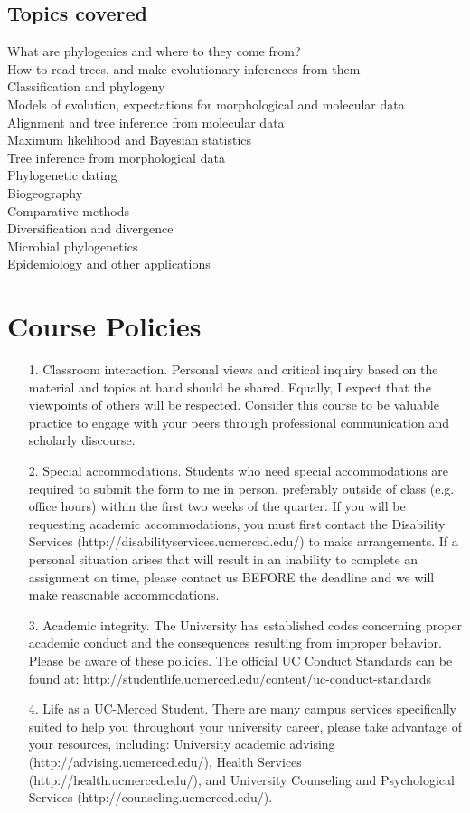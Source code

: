 \documentclass{article}
\begin{document}
\subsection*{Topics covered}
What are phylogenies and where to they come from?\\
How to read trees, and make evolutionary inferences from them\\
Classification and phylogeny\\
Models of evolution, expectations for morphological and molecular data\\
Alignment and tree inference from molecular data\\
Maximum likelihood and Bayesian statistics\\
Tree inference from morphological data\\
Phylogenetic dating\\
Biogeography\\
Comparative methods\\
Diversification and divergence\\
Microbial phylogenetics\\
Epidemiology and other applications\\


\section*{Course Policies}
\begin{itemize}
 \item[1.] Classroom interaction. Personal views and critical inquiry based on the material and topics at hand should be shared.
 Equally, I expect that the viewpoints of others will be respected. 
 Consider this course to be valuable practice to engage with your peers through professional communication and scholarly discourse. 
 \item[2.] Special accommodations. Students who need special accommodations are required to submit the form to me in person, preferably outside of class (e.g. office hours) within the first two weeks of the quarter. 
 If you will be requesting academic accommodations, you must first contact the Disability Services (http://disabilityservices.ucmerced.edu/) to make arrangements.
 If a personal situation arises that will result in an inability to complete an assignment on time, please contact us BEFORE the deadline and we will make reasonable accommodations.
\item[3.] Academic integrity. The University has established codes concerning proper academic conduct and the consequences resulting from improper behavior. 
Please be aware of these policies. The official UC Conduct Standards can be found at: http://studentlife.ucmerced.edu/content/uc-conduct-standards
\item[4.] Life as a UC-Merced Student. There are many campus services specifically suited to help you throughout your university career, please take advantage of your resources, 
including: University academic advising (http://advising.ucmerced.edu/), Health Services (http://health.ucmerced.edu/), and University Counseling and Psychological Services (http://counseling.ucmerced.edu/).
\end{itemize}
\end{document}
